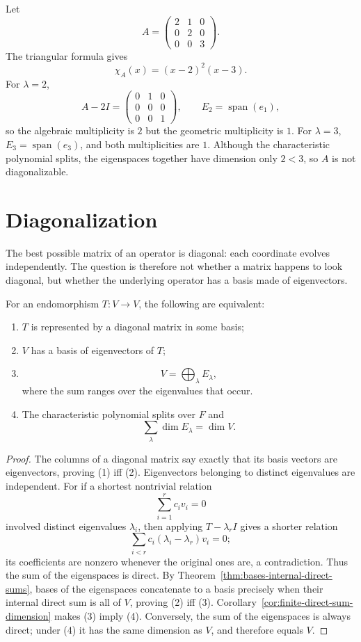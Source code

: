 \begin{example}
Let
\[
A=\begin{pmatrix}2&1&0\\0&2&0\\0&0&3\end{pmatrix}.
\]
The triangular formula gives
\[
\chi_A(x)=(x-2)^2(x-3).
\]
For \(\lambda=2\),
\[
A-2I=\begin{pmatrix}0&1&0\\0&0&0\\0&0&1\end{pmatrix},
\qquad
E_2=\operatorname{span}(e_1),
\]
so the algebraic multiplicity is \(2\) but the geometric multiplicity is
\(1\).  For \(\lambda=3\), \(E_3=\operatorname{span}(e_3)\), and both
multiplicities are \(1\).  Although the characteristic polynomial splits,
the eigenspaces together have dimension only \(2<3\), so \(A\) is not
diagonalizable.
\end{example}

\section{Diagonalization}
The best possible matrix of an operator is diagonal: each coordinate evolves
independently. The question is therefore not whether a matrix happens to
look diagonal, but whether the underlying operator has a basis made of
eigenvectors.

\begin{theorem}\label{thm:diagonalization-criterion}
For an endomorphism \(T:V\to V\), the following are equivalent:
\begin{enumerate}
\item \(T\) is represented by a diagonal matrix in some basis;
\item \(V\) has a basis of eigenvectors of \(T\);
\item
\[
V=\bigoplus_\lambda E_\lambda,
\]
where the sum ranges over the
eigenvalues that occur.
\item The characteristic polynomial splits over \(F\) and
\[
\sum_\lambda\dim E_\lambda=\dim V.
\]
\end{enumerate}
\end{theorem}
\begin{proof}
The columns of a diagonal matrix say exactly that its basis vectors are
eigenvectors, proving (1) iff (2). Eigenvectors belonging to distinct
eigenvalues are independent. For if a shortest nontrivial relation
\[
\sum_{i=1}^rc_iv_i=0
\]
involved distinct eigenvalues \(\lambda_i\), then
applying \(T-\lambda_rI\) gives a shorter relation
\[
\sum_{i<r}c_i(\lambda_i-\lambda_r)v_i=0;
\]
its coefficients are nonzero
whenever the original ones are, a contradiction. Thus the sum of the
eigenspaces is direct. By Theorem~\ref{thm:bases-internal-direct-sums}, bases
of the eigenspaces concatenate to a basis precisely when their internal
direct sum is all of \(V\), proving (2) iff (3).
Corollary~\ref{cor:finite-direct-sum-dimension}
makes (3)
imply (4).  Conversely, the sum of the eigenspaces is always direct; under
(4) it has the same dimension as \(V\), and therefore equals \(V\).
\end{proof}

